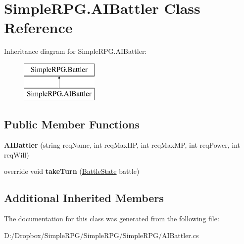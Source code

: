 \hypertarget{class_simple_r_p_g_1_1_a_i_battler}{\section{Simple\+R\+P\+G.\+A\+I\+Battler Class Reference}
\label{class_simple_r_p_g_1_1_a_i_battler}
}
Inheritance diagram for Simple\+R\+P\+G.\+A\+I\+Battler\+:\begin{figure}[H]
\begin{center}
\leavevmode
\includegraphics[height=2.000000cm]{class_simple_r_p_g_1_1_a_i_battler}
\end{center}
\end{figure}
\subsection*{Public Member Functions}
\begin{DoxyCompactItemize}
\item 
\hypertarget{class_simple_r_p_g_1_1_a_i_battler_ad738633dcee413ecdf95ee0d78e875d8}{{\bfseries A\+I\+Battler} (string req\+Name, int req\+Max\+H\+P, int req\+Max\+M\+P, int req\+Power, int req\+Will)}\label{class_simple_r_p_g_1_1_a_i_battler_ad738633dcee413ecdf95ee0d78e875d8}

\item 
\hypertarget{class_simple_r_p_g_1_1_a_i_battler_a3a1f2c68dda706c3a3f347e368275f3e}{override void {\bfseries take\+Turn} (\hyperlink{class_simple_r_p_g_1_1_states_1_1_battle_state}{Battle\+State} battle)}\label{class_simple_r_p_g_1_1_a_i_battler_a3a1f2c68dda706c3a3f347e368275f3e}

\end{DoxyCompactItemize}
\subsection*{Additional Inherited Members}


The documentation for this class was generated from the following file\+:\begin{DoxyCompactItemize}
\item 
D\+:/\+Dropbox/\+Simple\+R\+P\+G/\+Simple\+R\+P\+G/\+Simple\+R\+P\+G/A\+I\+Battler.\+cs\end{DoxyCompactItemize}
